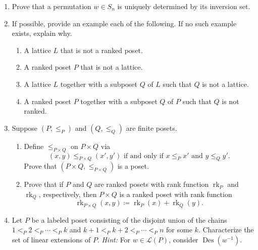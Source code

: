 \documentclass[11pt]{article}%
\theoremstyle{definition}
\DeclareMathOperator{\Des}{Des}
\DeclareMathOperator{\rk}{rk}
\begin{document}
\begin{enumerate}

\item Prove that a permutation $w\in S_n$ is uniquely determined by its inversion set.

\item If possible, provide an example each of the following. If no such example exists, explain why.
\begin{enumerate}
\item A lattice $L$ that is not a ranked poset.
\item A ranked poset $P$ that is not a lattice.
\item A lattice $L$ together with a subposet $Q$ of $L$ such that $Q$ is not a lattice.
\item A ranked poset $P$ together with a subposet $Q$ of $P$ such that $Q$ is not ranked. 
\end{enumerate}

\item Suppose $(P,\leq_P)$ and $(Q,\leq_Q)$ are finite posets. 
\begin{enumerate}
\item Define $\leq_{P\times Q}$ on $P\times Q$ via
\[
(x,y)\leq_{P\times Q} (x',y') \text{ if and only if } x\leq_P x'\text{ and } y\leq_Q y'.
\]
Prove that $(P\times Q,\leq_{P\times Q})$ is a poset.
\item Prove that if $P$ and $Q$ are ranked posets with rank function $\rk_P$ and $\rk_Q$, respectively, then $P\times Q$ is a ranked poset with rank function
\[
\rk_{P\times Q}(x,y)\coloneqq \rk_P(x)+\rk_Q(y).
\]
\end{enumerate}
\item  Let $P$ be a labeled poset consisting of the disjoint union of the chains $1<_P 2 <_P  \cdots <_P k$ and $k+1 <_P k+2 <_P \cdots <_P n$ for some $k$. Characterize the set of linear extensions of $P$. \emph{Hint:} For $w\in \mathcal{L}(P)$, consider $\Des(w^{-1})$.
\end{enumerate}
\end{document}
